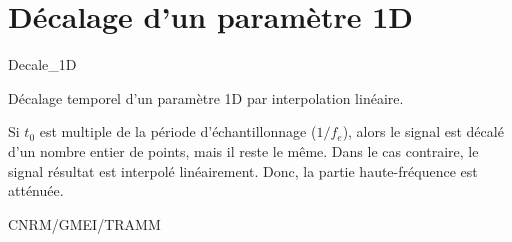 %
\section{D\'ecalage d'un param\`etre 1D}

 {\sf Decale\_1D}

D\'ecalage temporel d'un param\`etre 1D par
interpolation lin\'eaire. 

\bigskip






Si $t_0$ est multiple de la p\'eriode
d'\'echantillonnage ($1/f_e$), alors le signal
est d\'ecal\'e d'un nombre entier de points, mais il
reste le m\^eme. Dans le cas contraire, 
le signal r\'esultat est interpol\'e 
lin\'eairement. Donc,  
la partie haute-fr\'equence est att\'enu\'ee. 

CNRM/GMEI/TRAMM

